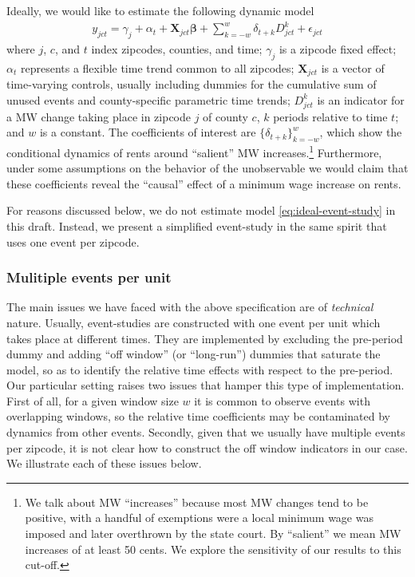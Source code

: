     Ideally, we would like to estimate the following dynamic model
    \begin{equation}\label{eq:ideal-event-study}
        \begin{split}
            y_{jct} = \gamma_{j} + \alpha_{t} + \boldsymbol{X}_{jct} \boldsymbol{\beta} + \sum_{k = -w}^{w}\delta_{t + k} D_{jct}^k + \epsilon_{jct}
        \end{split}   
    \end{equation}
    where $j$, $c$, and $t$ index zipcodes, counties, and time; $\gamma_{j}$ is a zipcode fixed effect; $\alpha_{t}$ represents a flexible time trend common to all zipcodes; $\boldsymbol{X}_{jct}$ is a vector of time-varying controls, usually including dummies for the cumulative sum of unused events and county-specific parametric time trends; $D_{jct}^k$ is an indicator for a MW change taking place in zipcode $j$ of county $c$, $k$ periods relative to time $t$; and $w$ is a constant. The coefficients of interest are $\{\delta_{t + k}\}_{k=-w}^w$, which show the conditional dynamics of rents around ``salient'' MW increases.\footnote{We talk about MW ``increases'' because most MW changes tend to be positive, with a handful of exemptions were a local minimum wage was imposed and later overthrown by the state court. By ``salient'' we mean MW increases of at least 50 cents. We explore the sensitivity of our results to this cut-off.} Furthermore, under some assumptions on the behavior of the unobservable we would claim that these coefficients reveal the ``causal'' effect of a minimum wage increase on rents.

    For reasons discussed below, we do not estimate model \eqref{eq:ideal-event-study} in this draft. Instead, we present a simplified event-study in the same spirit that uses one event per zipcode.

\subsubsection{Mulitiple events per unit}

    The main issues we have faced with the above specification are of \textit{technical} nature. Usually, event-studies are constructed with one event per unit which takes place at different times. They are implemented by excluding the pre-period dummy and adding ``off window'' (or ``long-run'') dummies that saturate the model, so as to identify the relative time effects with respect to the pre-period. Our particular setting raises two issues that hamper this type of implementation. First of all, for a given window size $w$ it is common to observe events with overlapping windows, so the relative time coefficients may be contaminated by dynamics from other events. Secondly, given that we usually have multiple events per zipcode, it is not clear how to construct the off window indicators in our case. We illustrate each of these issues below.
    
